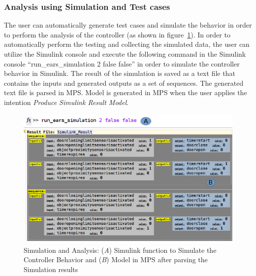 \subsubsection{Analysis using Simulation and Test cases} The user can automatically generate test cases and
simulate the behavior in order to perform the analysis of the controller
(as shown in figure~\ref{fig:SimandAnalysis}). In order to automatically perform
the testing and collecting the simulated data, the user can utilize the Simulink console and execute the following command in the Simulink console
``run\_ears\_simulation 2 false false'' in order to simulate the
controller behavior in Simulink. The result of the simulation is saved as a text file that contains the inputs and generated outputs as a set of sequences. The generated text file is parsed in MPS. Model
is generated in MPS when the user applies the intention \emph{Produce Simulink Result Model}.
\begin{figure}[!h]
\centering
\includegraphics[width=1\textwidth]{./images/Simulation_and_Analysis.png}
\caption{Simulation and Analysis: (\emph{A}) Simulink function to Simulate the
Controller Behavior and (\emph{B}) Model in MPS after parsing the
Simulation results}
\label{fig:SimandAnalysis}
\end{figure}